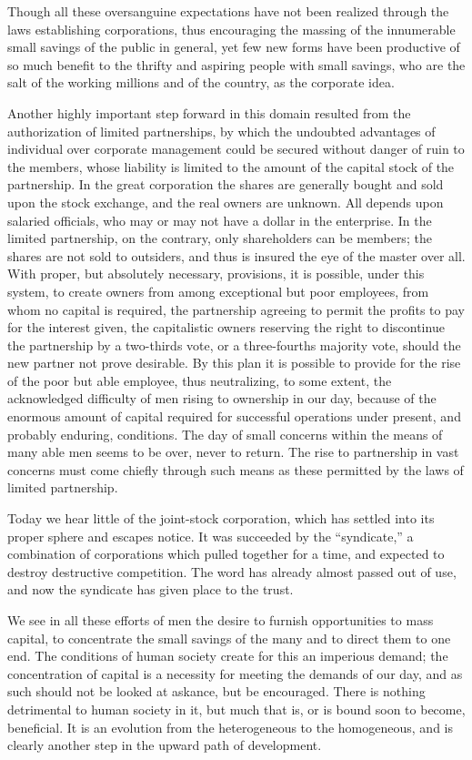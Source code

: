 \documentclass[11pt,openany]{book}
\begin{document}
Though all these oversanguine expectations have not been realized through the laws establishing corporations, thus encouraging the massing of the innumerable small savings of the public in general, yet few new forms have been productive of so much benefit to the thrifty and aspiring people with small savings, who are the salt of the working millions and of the country, as the corporate idea.

Another highly important step forward in this domain resulted from the authorization of limited partnerships, by which the undoubted advantages of individual over corporate management could be secured without danger of ruin to the members, whose liability is limited to the amount of the capital stock of the partnership. In the great corporation the shares are generally bought and sold upon the stock exchange, and the real owners are unknown. All depends upon salaried officials, who may or may not have a dollar in the enterprise. In the limited partnership, on the contrary, only shareholders can be members; the shares are not sold to outsiders, and thus is insured the eye of the master over all. With proper, but absolutely necessary, provisions, it is possible, under this system, to create owners from among exceptional but poor employees, from whom no capital is required, the partnership agreeing to permit the profits to pay for the interest given, the capitalistic owners reserving the right to discontinue the partnership by a two-thirds vote, or a three-fourths majority vote, should the new partner not prove desirable. By this plan it is possible to provide for the rise of the poor but able employee, thus neutralizing, to some extent, the acknowledged difficulty of men rising to ownership in our day, because of the enormous amount of capital required for successful operations under present, and probably enduring, conditions. The day of small concerns within the means of many able men seems to be over, never to return. The rise to partnership in vast concerns must come chiefly through such means as these permitted by the laws of limited partnership.

Today we hear little of the joint-stock corporation, which has settled into its proper sphere and escapes notice. It was succeeded by the ``syndicate,'' a combination of corporations which pulled together for a time, and expected to destroy destructive competition. The word has already almost passed out of use, and now the syndicate has given place to the trust.

We see in all these efforts of men the desire to furnish opportunities to mass capital, to concentrate the small savings of the many and to direct them to one end. The conditions of human society create for this an imperious demand; the concentration of capital is a necessity for meeting the demands of our day, and as such should not be looked at askance, but be encouraged. There is nothing detrimental to human society in it, but much that is, or is bound soon to become, beneficial. It is an evolution from the heterogeneous to the homogeneous, and is clearly another step in the upward path of development.
\end{document}
